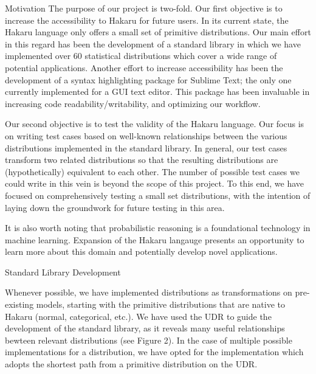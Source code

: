 \documentclass[22pt]{beamer}
\begin{document}
\begin{frame}[fragile]
\begin{textblock}{5}
\begin{textblock}{5}
\begin{block}{Motivation}
\tiny{The purpose of our project is two-fold. Our first objective is to increase the accessibility to Hakaru for future users. In its current state, the Hakaru language only offers a small set of primitive distributions. Our main effort in this regard has been the development of a standard library in which we have implemented over 60 statistical distributions which cover a wide range of potential applications. Another effort to increase accessibility has been the development of a syntax highlighting package for Sublime Text; the only one currently implemented for a GUI text editor. This package has been invaluable in increasing code readability/writability, and optimizing our workflow.}

\bigskip

\tiny{Our second objective is to test the validity of the Hakaru language. Our focus is on writing test cases based on well-known relationships between the various distributions implemented in the standard library. In general, our test cases transform two related distributions so that the resulting distributions are (hypothetically) equivalent to each other. The number of possible test cases we could write in this vein is beyond the scope of this project. To this end, we have focused on comprehensively testing a small set distributions, with the intention of laying down the groundwork for future testing in this area.}

\bigskip

\tiny{It is also worth noting that probabilistic reasoning is a foundational technology in machine learning. Expansion of the Hakaru langauge presents an opportunity to learn more about this domain and potentially develop novel applications.}

\end{block}


\begin{block}{Standard Library Development}
\justifying

\tiny{Whenever possible, we have implemented distributions as transformations on pre-existing models, starting with the primitive distributions that are native to Hakaru (normal, categorical, etc.). We have used the UDR to guide the development of the standard library, as it reveals many useful relationships bewteen relevant distributions (see Figure 2). In the case of multiple possible implementations for a distribution, we have opted for the implementation which adopts the shortest path from a primitive distribution on the UDR.}


\end{block}
\end{textblock}
\end{textblock}
\end{frame}
\end{document}
